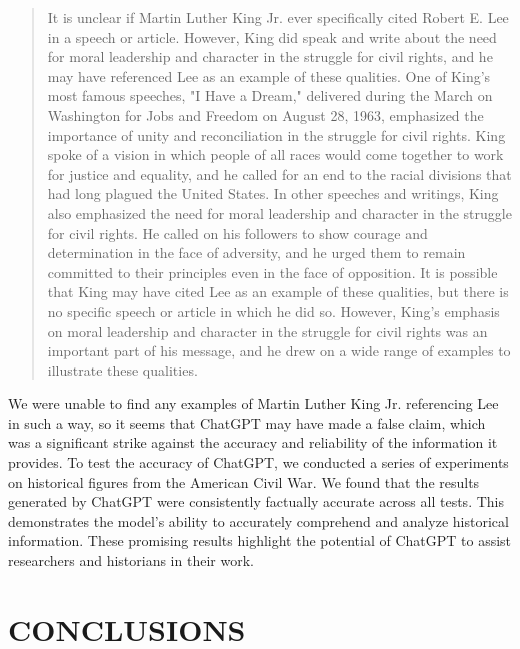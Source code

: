 \documentclass[letterpaper, 10pt, conference]{ieeeconf}
\begin{document}
    \begin{quote}
        
    It is unclear if Martin Luther King Jr. ever specifically cited Robert E. Lee in a speech or article. However, King did
    speak and write about the need for moral leadership and character in the struggle for civil rights, and he may have
    referenced Lee as an example of these qualities. One of King's most famous speeches, "I Have a Dream," delivered during
    the March on Washington for Jobs and Freedom on August 28, 1963, emphasized the importance of unity and
    reconciliation in the struggle for civil rights. King spoke of a vision in which people of all races would come together to
    work for justice and equality, and he called for an end to the racial divisions that had long plagued the United States. In
    other speeches and writings, King also emphasized the need for moral leadership and character in the struggle for civil
    rights. He called on his followers to show courage and determination in the face of adversity, and he urged them to
    remain committed to their principles even in the face of opposition. It is possible that King may have cited Lee as an
    example of these qualities, but there is no specific speech or article in which he did so. However, King's emphasis on
    moral leadership and character in the struggle for civil rights was an important part of his message, and he drew on a
    wide range of examples to illustrate these qualities.
    \end{quote}

    We were unable to find any examples of Martin Luther King Jr. referencing Lee in such a way, so it seems that ChatGPT may have
    made a false claim, which was a significant strike against the accuracy and reliability of the information it provides.
    To test the accuracy of ChatGPT, we conducted a series of experiments on historical figures from the American Civil War. We
    found that the results generated by ChatGPT were consistently factually accurate across all tests. This demonstrates the model's
    ability to accurately comprehend and analyze historical information. These promising results highlight the potential of ChatGPT to
    assist researchers and historians in their work.
    
    \section{CONCLUSIONS}
    
\end{document}

